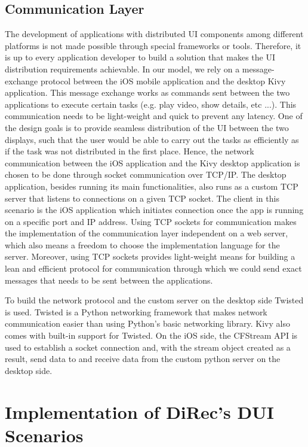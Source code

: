 \subsection{Communication Layer}
The development of applications with distributed UI components among different
platforms is not made possible through special frameworks or tools. Therefore,
it is up to every application developer to build a solution that makes the
UI distribution requirements achievable. In our model, we rely on a
message-exchange protocol between the iOS mobile application and the desktop
Kivy application. This message exchange works as commands sent between the two
applications to execute certain tasks (e.g. play video, show details, etc ...).
This communication needs to be light-weight and quick to prevent any latency.
One of the design goals is to provide seamless distribution of the UI between
the two displays, such that the user would be able to carry out the tasks as efficiently as if the task was not distributed in the first place. Hence, the network communication between the iOS application and the Kivy desktop application is chosen to be done through socket communication over TCP/IP. The desktop application, besides running its main functionalities, also runs as a custom TCP server that listens to connections on a given TCP socket. The client in this scenario is the iOS application which initiates connection once the app is running on a specific port and IP address. Using TCP sockets for communication makes the implementation of the communication layer independent on a web server, which also means a freedom to choose the implementation language for the server. Moreover, using TCP sockets provides light-weight means for building a lean and efficient protocol for communication through which we could send exact messages that needs to be sent between the applications.\par To build the network protocol and the custom server on the desktop side Twisted is used. Twisted is a Python networking framework that makes network communication easier than using Python's basic networking library. Kivy also
comes with built-in support for Twisted. On the iOS side, the CFStream API is
used to establish a socket connection and, with the stream object created as a result, send data to and receive data from the custom python server on the desktop side.

\section{Implementation of DiRec's DUI Scenarios}

